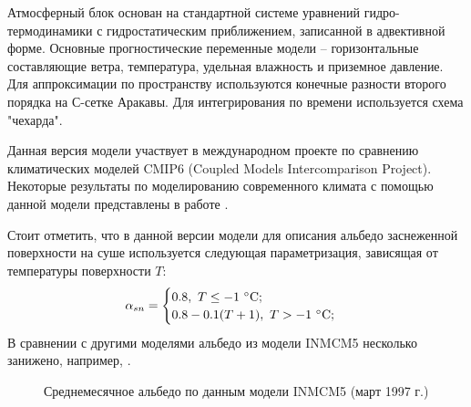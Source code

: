 \documentclass[a4paper, fontsize=14pt]{scrartcl}
\begin{document}
Атмосферный блок основан на стандартной системе уравнений гидро-термодинамики с гидростатическим приближением, записанной в адвективной форме. Основные прогностические переменные модели -- горизонтальные составляющие ветра, температура, удельная влажность и приземное давление. Для аппроксимации по пространству используются конечные разности второго порядка на С-сетке Аракавы. Для интегрирования по времени используется схема "чехарда".

Данная версия модели участвует в международном проекте по сравнению климатических моделей CMIP6 (Coupled Models Intercomparison Project). Некоторые результаты по моделированию современного климата с помощью данной модели представлены в работе \cite{Volodin2017}.  \sloppy 

Стоит отметить, что в данной версии модели для описания альбедо заснеженной поверхности на суше используется следующая параметризация, зависящая от температуры поверхности $T$:
\begin{equation}
    \alpha_{sn} = \begin{cases}
                        0.8,~ T \leq -1 ~\degree \mathrm{C}; \\
                        0.8 - 0.1(T + 1), ~T > -1 ~\degree \mathrm{C};
                  \end{cases} \label{sysAlbOld}
\end{equation}
В сравнении с другими моделями альбедо из модели INMCM5 несколько занижено, например, \cite{Flanner2007, Gueymard2019}.

\newpage
\begin{figure}[h]
    \caption{Среднемесячное альбедо по данным модели INMCM5 (март 1997 г.)}
    \label{fig:imageAlbOld}
\end{figure}
\end{document}
